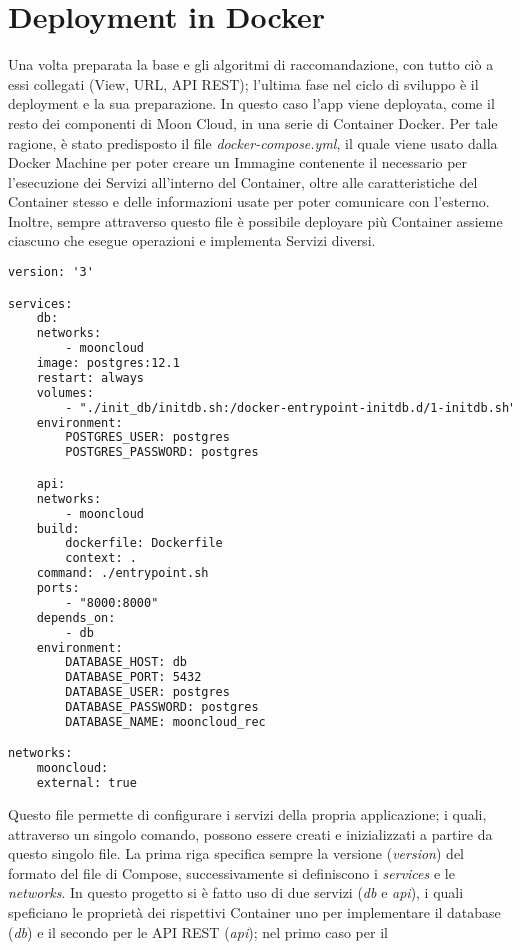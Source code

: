\section*{Deployment in Docker}
Una volta preparata la base e gli algoritmi di raccomandazione, con tutto ciò a essi collegati (View, URL, API REST); l'ultima fase nel ciclo di sviluppo è il 
deployment e la sua preparazione. In questo caso l'app viene deployata, come il resto dei componenti di Moon Cloud, in una serie di Container Docker. Per 
tale ragione, è stato predisposto il file \textit{docker-compose.yml}, il quale viene usato dalla Docker Machine per poter creare un Immagine contenente 
il necessario per l'esecuzione dei Servizi all'interno del Container, oltre alle caratteristiche del Container stesso e delle informazioni usate per poter 
comunicare con l'esterno. Inoltre, sempre attraverso questo file è possibile deployare più Container assieme ciascuno che esegue operazioni e 
implementa Servizi diversi.
\lstset{style=python_code_style}
\begin{lstlisting}[language=Xml, label=lst:docker_compose, caption={Contenuto del file docker-compose.yml per il deployment del sistema di raccomandazione 
    all'interno di un Container.}]
version: '3'

services:
    db:
    networks:
        - mooncloud
    image: postgres:12.1
    restart: always
    volumes:
        - "./init_db/initdb.sh:/docker-entrypoint-initdb.d/1-initdb.sh"
    environment:
        POSTGRES_USER: postgres
        POSTGRES_PASSWORD: postgres

    api:
    networks:
        - mooncloud
    build:
        dockerfile: Dockerfile
        context: .
    command: ./entrypoint.sh
    ports:
        - "8000:8000"
    depends_on:
        - db
    environment:
        DATABASE_HOST: db
        DATABASE_PORT: 5432
        DATABASE_USER: postgres
        DATABASE_PASSWORD: postgres
        DATABASE_NAME: mooncloud_rec

networks:
    mooncloud:
    external: true
\end{lstlisting}
%
Questo file permette di configurare i servizi della propria applicazione; i quali, attraverso un singolo comando, possono essere creati e inizializzati a 
partire da questo singolo file.
La prima riga specifica sempre la versione (\textit{version}) del formato del file di Compose, successivamente si definiscono i \textit{services} e 
le \textit{networks}. In questo progetto si è fatto uso di due servizi (\textit{db} e \textit{api}), i quali speficiano le 
proprietà dei rispettivi Container uno per implementare il database (\textit{db}) e il secondo per le API REST (\textit{api}); nel primo caso per il 
